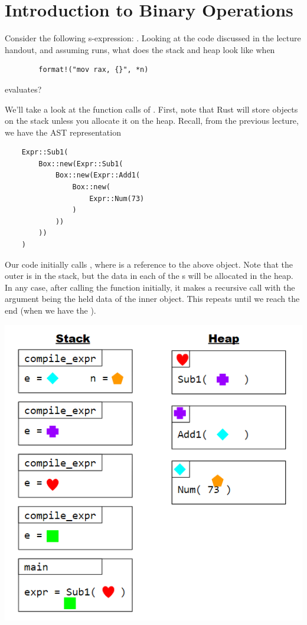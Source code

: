 \documentclass[letterpaper]{article}
\begin{document}
\section{Introduction to Binary Operations}

\begin{mdframed}
    Consider the following s-expression: . Looking at the code discussed in the lecture handout, and assuming  runs, what does the stack and heap look like when \begin{verbatim}
        format!("mov rax, {}", *n)\end{verbatim} 
    evaluates? 

    \begin{mdframed}
        We'll take a look at the function calls of . First, note that Rust will store objects on the stack unless you allocate it on the heap. Recall, from the previous lecture, we have the AST representation 
                \begin{verbatim}
    Expr::Sub1(
        Box::new(Expr::Sub1(
            Box::new(Expr::Add1(
                Box::new(
                    Expr::Num(73)
                )
            ))
        ))
    )\end{verbatim}
        
        Our code initially calls , where  is a reference to the above object. Note that the outer  is in the stack, but the data in each of the s will be allocated in the heap. In any case, after calling the function initially, it makes a recursive call with the argument being the held data of the inner object. This repeats until we reach the end (when we have the ). 
        \begin{center}
            \includegraphics[scale=0.7]{../assets/memory_diagram.png}
        \end{center}
    \end{mdframed}
\end{mdframed}
\end{document}
